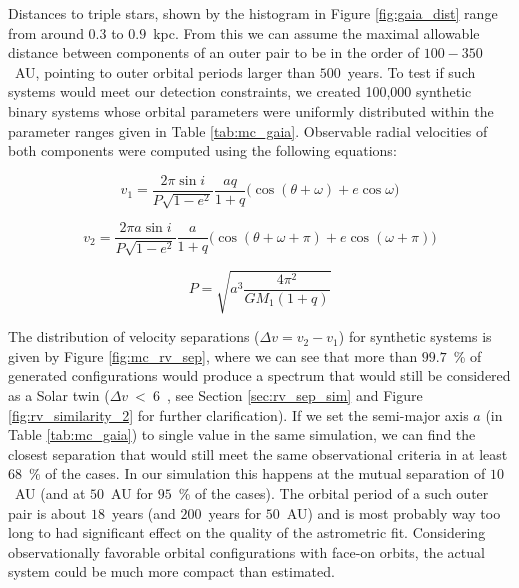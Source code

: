 Distances to triple stars, shown by the histogram in Figure \ref{fig:gaia_dist} range from around $0.3$ to $0.9$~kpc. From this we can assume the maximal allowable distance between components of an outer pair to be in the order of $100-350$~AU, pointing to outer orbital periods larger than $500$~years. To test if such systems would meet our detection constraints, we created 100,000 synthetic binary systems whose orbital parameters were uniformly distributed within the parameter ranges given in Table \ref{tab:mc_gaia}. Observable radial velocities of both components were computed using the following equations:

\begin{equation}
	\label{equ:rad_vel1}
	v_{1} = \frac{2 \pi \sin i}{P \sqrt{1 - e^2}} \frac{a q}{1+q} \Big(\cos(\theta + \omega) + e \cos \omega \Big)
\end{equation}

\begin{equation}
	\label{equ:rad_vel2}
	v_{2} = \frac{2 \pi a \sin i}{P \sqrt{1 - e^2}} \frac{a}{1+q} \Big(\cos(\theta + \omega + \pi) + e \cos (\omega  + \pi) \Big)
\end{equation}

\begin{equation}
	\label{equ:rad_period}
	P = \sqrt{a^3 \frac{4 \pi^2}{G M_1 (1 + q)}}
\end{equation}

The distribution of velocity separations ($\Delta v = v_2 - v_1$) for synthetic systems is given by Figure \ref{fig:mc_rv_sep}, where we can see that more than $99.7$~\% of generated configurations would produce a spectrum that would still be considered as a Solar twin ($\Delta v$~<~6~\kms, see Section \ref{sec:rv_sep_sim} and Figure \ref{fig:rv_similarity_2} for further clarification). If we set the semi-major axis $a$ (in Table \ref{tab:mc_gaia}) to single value in the same simulation, we can find the closest separation that would still meet the same observational criteria in at least $68$~\% of the cases. In our simulation this happens at the mutual separation of $10$~AU (and at $50$~AU for $95$~\% of the cases). The orbital period of a such outer pair is about $18$~years (and $200$~years for $50$~AU) and is most probably way too long to had significant effect on the quality of the astrometric fit. Considering observationally favorable orbital configurations with face-on orbits, the actual system could be much more compact than estimated.

